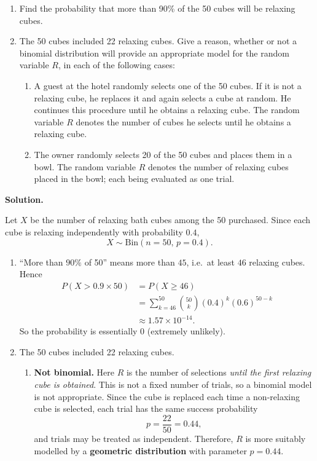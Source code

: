 \documentclass[12pt]{scrartcl}
\begin{document}
\begin{enumerate}[label=\textbf{\arabic*.}]
\begin{enumerate}[label=(\alph*)]
\item Find the probability that more than 90\% of the 50 cubes will be relaxing cubes.
\item The 50 cubes included 22 relaxing cubes. Give a reason, whether or not a binomial distribution will provide an appropriate model for the random variable $R$, in each of the following cases:
\begin{enumerate}[label=\roman*.]
\item A guest at the hotel randomly selects one of the 50 cubes. If it is not a relaxing cube, he replaces it and again selects a cube at random.
He continues this procedure until he obtains a relaxing cube. The random variable $R$ denotes the number of cubes he selects until he obtains a relaxing cube.
\item The owner randomly selects 20 of the 50 cubes and places them in a bowl. The random variable $R$ denotes the number of relaxing cubes placed in the bowl; each being evaluated as one trial.
\end{enumerate}
\end{enumerate}

\medskip

\textbf{Solution.}

Let $X$ be the number of relaxing bath cubes among the 50 purchased. Since each cube is relaxing independently with probability $0.4$,
\[
X \sim \mathrm{Bin}(n=50,\,p=0.4).
\]

\begin{enumerate}[label=(\alph*)]
\item “More than $90\%$ of 50” means more than $45$, i.e.\ at least $46$ relaxing cubes. Hence
\begin{align*}
P(X>0.9\times 50)
&=P(X\ge 46)\\
&=\sum_{k=46}^{50}\binom{50}{k}(0.4)^k(0.6)^{50-k}\\
&\approx 1.57\times 10^{-14}.
\end{align*}
So the probability is essentially $0$ (extremely unlikely).

\item The 50 cubes included 22 relaxing cubes.

\begin{enumerate}[label=\roman*.]
\item \textbf{Not binomial.} Here $R$ is the number of selections \emph{until the first relaxing cube is obtained}.
This is not a fixed number of trials, so a binomial model is not appropriate.  
Since the cube is replaced each time a non-relaxing cube is selected, each trial has the same success probability
\[
p=\frac{22}{50}=0.44,
\]
and trials may be treated as independent. Therefore, $R$ is more suitably modelled by a \textbf{geometric distribution} with parameter $p=0.44$.


\end{enumerate}
\end{enumerate}
\end{enumerate}
\end{document}
